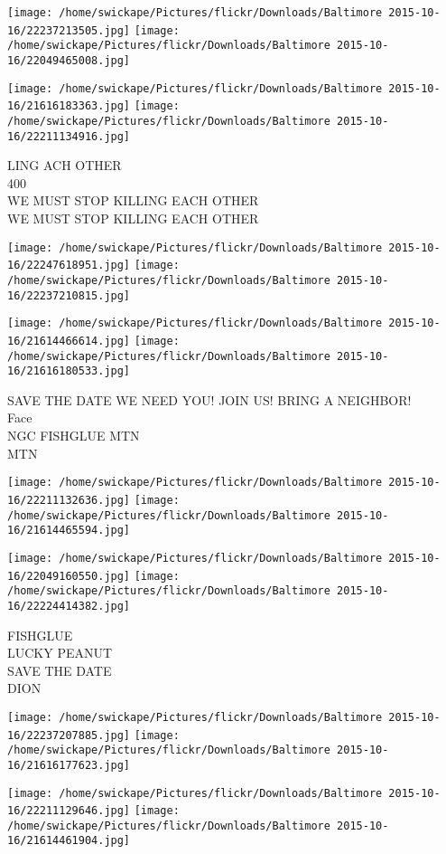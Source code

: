 \documentclass[10pt,letterpaper]{article}
\begin{document}
\texttt{[image: /home/swickape/Pictures/flickr/Downloads/Baltimore 2015-10-16/22237213505.jpg]}
\texttt{[image: /home/swickape/Pictures/flickr/Downloads/Baltimore 2015-10-16/22049465008.jpg]}

\texttt{[image: /home/swickape/Pictures/flickr/Downloads/Baltimore 2015-10-16/21616183363.jpg]}
\texttt{[image: /home/swickape/Pictures/flickr/Downloads/Baltimore 2015-10-16/22211134916.jpg]}

LING ACH OTHER\\
400\\
WE MUST STOP KILLING EACH OTHER\\
WE MUST STOP KILLING EACH OTHER
\pagebreak

\texttt{[image: /home/swickape/Pictures/flickr/Downloads/Baltimore 2015-10-16/22247618951.jpg]}
\texttt{[image: /home/swickape/Pictures/flickr/Downloads/Baltimore 2015-10-16/22237210815.jpg]}

\texttt{[image: /home/swickape/Pictures/flickr/Downloads/Baltimore 2015-10-16/21614466614.jpg]}
\texttt{[image: /home/swickape/Pictures/flickr/Downloads/Baltimore 2015-10-16/21616180533.jpg]}

SAVE THE DATE WE NEED YOU!  JOIN US!  BRING A NEIGHBOR!\\
Face\\
NGC FISHGLUE MTN\\
MTN
\pagebreak

\texttt{[image: /home/swickape/Pictures/flickr/Downloads/Baltimore 2015-10-16/22211132636.jpg]}
\texttt{[image: /home/swickape/Pictures/flickr/Downloads/Baltimore 2015-10-16/21614465594.jpg]}

\texttt{[image: /home/swickape/Pictures/flickr/Downloads/Baltimore 2015-10-16/22049160550.jpg]}
\texttt{[image: /home/swickape/Pictures/flickr/Downloads/Baltimore 2015-10-16/22224414382.jpg]}

FISHGLUE\\
LUCKY PEANUT\\
SAVE THE DATE\\
DION
\pagebreak

\texttt{[image: /home/swickape/Pictures/flickr/Downloads/Baltimore 2015-10-16/22237207885.jpg]}
\texttt{[image: /home/swickape/Pictures/flickr/Downloads/Baltimore 2015-10-16/21616177623.jpg]}

\texttt{[image: /home/swickape/Pictures/flickr/Downloads/Baltimore 2015-10-16/22211129646.jpg]}
\texttt{[image: /home/swickape/Pictures/flickr/Downloads/Baltimore 2015-10-16/21614461904.jpg]}
\end{document}
